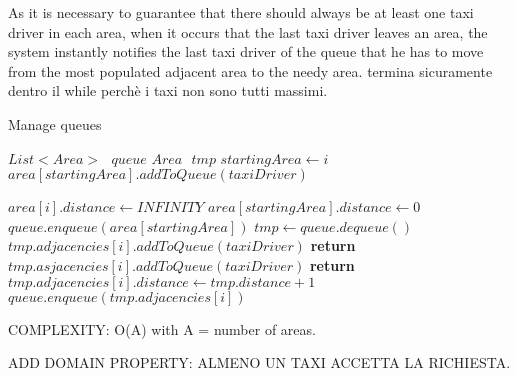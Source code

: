 \documentclass[18pt,oneside,a4paper, titlepage]{article}
\begin{document}
\begin{itemize}
			
			 As it is necessary to guarantee that there should always be at least one taxi driver in each area, when it occurs that the last taxi driver leaves an area, the system instantly notifies the last taxi driver of the queue that he has to move from the most populated adjacent area to the needy area.
			termina sicuramente dentro il while perchè i taxi non sono tutti massimi.
			
			
			\begin{algorithm}
				\caption{Manage queues}
				\begin{algorithmic}[1]
					\State $List<Area> \text{ } queue$
					\State $Area \text{ } tmp$
							\State $ startingArea \gets i $
						\EndIf
					\EndFor
						\State $ area[startingArea].addToQueue(taxiDriver)$
					
					\Else
							\State $area[i].distance \gets INFINITY $
						\EndFor
						\State $area[startingArea].distance \gets 0$
						\State $ queue.enqueue(area[startingArea])$
							\State $ tmp \gets queue.dequeue() $
									\State $tmp.adjacencies[i].addToQueue(taxiDriver)$
									\State \textbf{return} 
								\EndIf
							\EndFor
									\State $tmp.asjacencies[i].addToQueue(taxiDriver)$
									\State \textbf{return} 
								\EndIf
									\State $tmp.adjacencies[i].distance \gets tmp.distance + 1$
									\State $ queue.enqueue(tmp.adjacencies[i])$
								\EndIf
							\EndFor
						\EndWhile
					
					
					\EndIf
					\EndProcedure
				\end{algorithmic}
			\end{algorithm}
			COMPLEXITY: O(A) with A = number of areas.
		\end{itemize}
		
	ADD DOMAIN PROPERTY: ALMENO UN TAXI ACCETTA LA RICHIESTA.
	
	
\end{document}

